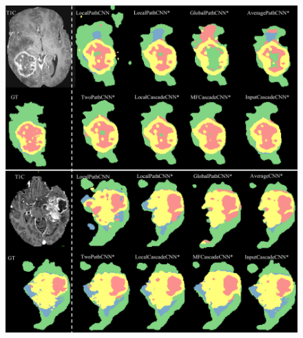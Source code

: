 \documentclass[final,5p,times,twocolumn]{elsarticle}
\begin{document}
{%


 

\begin{figure}[p!]

\centering

\includegraphics[width=\linewidth]{results.pdf}


\end{figure}}
\end{document}
